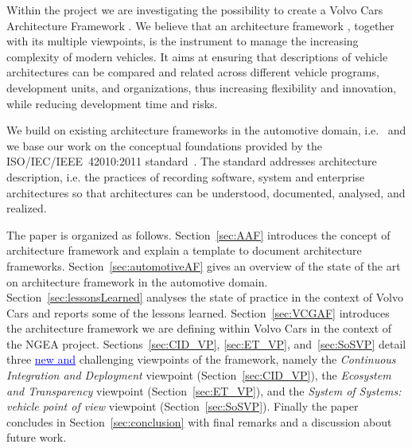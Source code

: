 \documentclass[preprint,12pt,3p]{elsarticle}
\newcommand{\ins}[1]{\textcolor{blue}{\uline{#1}}} %
\newcommand{\del}[1]{\textcolor{red}{\sout{#1}}} %
\newcommand\eric[1]{\nb{Eric}{#1}}
\begin{document}
Within the project we are investigating the possibility to create a Volvo Cars Architecture Framework \del{\cite{42010}}. %
We believe that an architecture framework \ins{\cite{42010}}, together with its multiple viewpoints, is the instrument to manage the increasing complexity of modern vehicles.
It aims at ensuring that descriptions of vehicle architectures can be compared and related across different vehicle programs,
development units, and organizations, thus increasing flexibility and innovation, while reducing development time and risks.

We build on existing architecture frameworks in the automotive domain, i.e.~\cite{Broy,Yania} and we base our work on the conceptual foundations provided by the ISO/IEC/IEEE~42010:2011 standard~\cite{42010}.   
The standard 
 addresses architecture description, i.e. the practices of recording software, system
and enterprise architectures so that architectures can be understood,
documented, analysed, and realized. 

The paper is organized as follows. Section~\ref{sec:AAF} introduces the concept of architecture framework and explain a template to document architecture frameworks. Section~\ref{sec:automotiveAF} gives an overview of 
 the state of the art on architecture framework in the automotive domain. Section~\ref{sec:lessonsLearned} analyses the state of practice in the context of Volvo Cars and reports some of the lessons learned. Section~\ref{sec:VCGAF} introduces the architecture framework we are defining within Volvo Cars in the context of the NGEA project. Sections~\ref{sec:CID_VP}, \ref{sec:ET_VP}, and~\ref{sec:SoSVP} detail three \ins{new and} challenging viewpoints of the framework, namely the {\em Continuous Integration and Deployment} viewpoint (Section~\ref{sec:CID_VP}), the {\em Ecosystem and Transparency} viewpoint (Section~\ref{sec:ET_VP}), and the {\em System of Systems: vehicle point of view} viewpoint (Section~\ref{sec:SoSVP}).\eric{should we mention scenarios?}
Finally the paper concludes in Section~\ref{sec:conclusion} with final remarks and a discussion about future work. 
\end{document}
